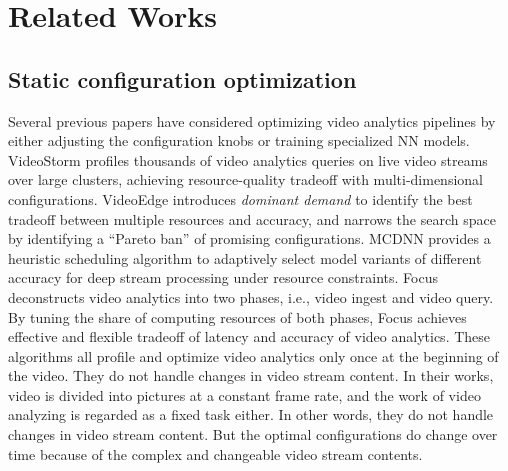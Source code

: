 \section{Related Works}
\label{Section: related_works}

\subsection{Static configuration optimization}
Several previous papers have considered optimizing video analytics pipelines by either adjusting the configuration knobs or training specialized NN models. VideoStorm \cite{zhang2017videostorm} profiles thousands of video analytics queries on live video streams over large clusters, achieving resource-quality tradeoff with multi-dimensional configurations. VideoEdge \cite{hung2018videoedge} introduces \emph{dominant demand} to identify the best tradeoff between multiple resources and accuracy, and narrows the search space by identifying a ``Pareto ban'' of promising configurations. MCDNN \cite{han2016mcdnn} provides a heuristic scheduling algorithm to adaptively select model variants of different accuracy for deep stream processing under resource constraints. Focus \cite{hsieh2018focus} deconstructs video analytics into two phases, i.e., video ingest and video query. By tuning the share of computing resources of both phases, Focus achieves effective and flexible tradeoff of latency and accuracy of video analytics. These algorithms all profile and optimize video analytics only once at the beginning of the video. They do not handle changes in video stream content. In their works, video is divided into pictures at a constant frame rate, and the work of video analyzing is regarded as a fixed task either. In other words, they do not handle changes in video stream content. But the optimal configurations do change over time because of the complex and changeable video stream contents.

